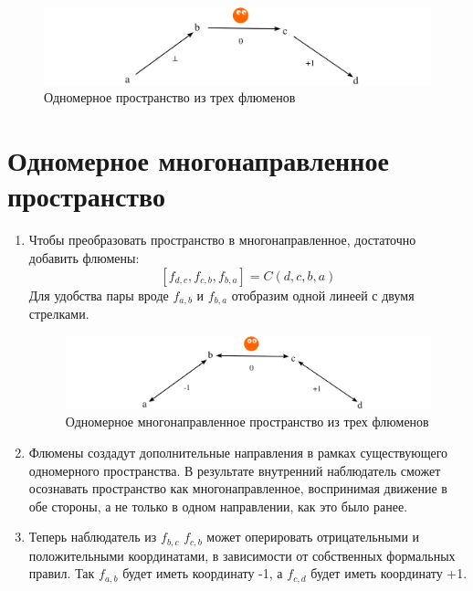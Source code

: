 \documentclass[final]{article}
\begin{document}
\begin{enumerate}
            \begin{figure}[H]
                \centering
                \includegraphics[width=\textwidth]{./1d-f1f2f3.png}
                \caption{Одномерное пространство из трех флюменов}
                \label{fig:image}
            \end{figure}

        \end{enumerate}


    \section{Одномерное многонаправленное пространство}

        \begin{enumerate}

            \item Чтобы преобразовать пространство в многонаправленное, достаточно 
            добавить флюмены: \[ [f_{d,c}, f_{c,b}, f_{b,a}]=C(d,c,b,a) \] Для 
            удобства пары вроде \( f_{a,b} \) и \(f_{b,a}\) отобразим одной линеей с 
            двумя стрелками.

            \begin{figure}[H]
                \centering
                \includegraphics[width=\textwidth]{./1d-f1f2f3-bidir.png}
                \caption{Одномерное многонаправленное пространство из трех флюменов}
                \label{fig:image}
            \end{figure}

            \item Флюмены создадут дополнительные направления в рамках существующего 
            одномерного пространства. В результате внутренний наблюдатель сможет 
            осознавать пространство как многонаправленное, воспринимая движение в 
            обе стороны, а не только в одном направлении, как это было ранее.

            \item Теперь наблюдатель из \(f_{b,c}\) \(f_{c,b}\) может оперировать 
            отрицательными и положительными координатами, в зависимости от 
            собственных формальных правил. Так \(f_{a,b}\) будет иметь координату 
            -1, а \(f_{c,d}\) будет иметь координату +1.

        \end{enumerate}
\end{document}
